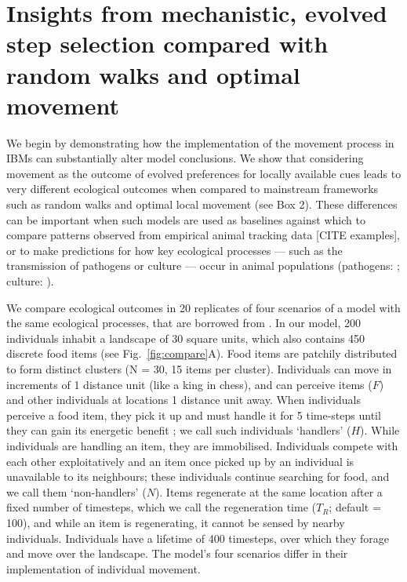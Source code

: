 \section*{Insights from mechanistic, evolved step selection compared with random walks and optimal movement}

We begin by demonstrating how the implementation of the movement process in IBMs can substantially alter model conclusions.
We show that considering movement as the outcome of evolved preferences for locally available cues leads to very different ecological outcomes when compared to mainstream frameworks such as random walks and optimal local movement (see Box 2).
These differences can be important when such models are used as baselines against which to compare patterns observed from empirical animal tracking data [CITE examples], or to make predictions for how key ecological processes --- such as the transmission of pathogens or culture --- occur in animal populations (pathogens: \cite{white2018,white2018b,cantor2021,scherer2020}; culture: \cite{romano2020,romano2021,cantor2021,cantor2021a}).

We compare ecological outcomes in 20 replicates of four scenarios of a model with the same ecological processes, that are borrowed from \citet{gupte2022c}.
In our model, 200 individuals inhabit a landscape of 30 square units, which also contains 450 discrete food items (see Fig.~\ref{fig:compare}A).
Food items are patchily distributed to form distinct clusters (N = 30, 15 items per cluster).
Individuals can move in increments of 1 distance unit (like a king in chess), and can perceive items ($F$) and other individuals at locations 1 distance unit away.
When individuals perceive a food item, they pick it up and must handle it for 5 time-steps until they can gain its energetic benefit \citep{ruxton1992,gupte2021a,gupte2022c}; we call such individuals `handlers' ($H$).
While individuals are handling an item, they are immobilised.
Individuals compete with each other exploitatively and an item once picked up by an individual is unavailable to its neighbours; these individuals continue searching for food, and we call them `non-handlers' ($N$).
Items regenerate at the same location after a fixed number of timesteps, which we call the regeneration time ($T_R$; default = 100), and while an item is regenerating, it cannot be sensed by nearby individuals.
Individuals have a lifetime of 400 timesteps, over which they forage and move over the landscape.
The model's four scenarios differ in their implementation of individual movement.

